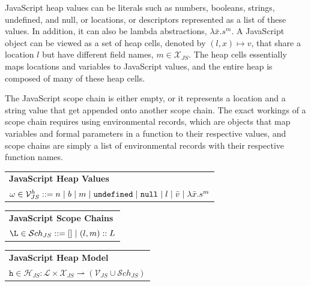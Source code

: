 \documentclass[a4paper,11pt,twoside]{report}
\begin{document}
JavaScript heap values can be literals such as numbers, booleans, strings, undefined, and null, or locations, or descriptors represented as a list of these values. In addition, it can also be lambda abstractions, $\lambda \bar{x}.s^m$. A JavaScript object can be viewed as a set of heap cells, denoted by $(l, x) \mapsto v$, that share a location $l$ but have different field names, $m \in \mathcal{X}_{JS}$. The heap cells essentially maps locations and variables to JavaScript values, and the entire heap is composed of many of these heap cells. 

The JavaScript scope chain is either empty, or it represents a location and a string value that get appended onto another scope chain. The exact workings of a scope chain requires using environmental records, which are objects that map variables and formal parameters in a function to their respective values, and scope chains are simply a list of environmental records with their respective function names.

\begin{center}
\begin{tabular}{p{10cm}} \hline
\textbf{JavaScript Heap Values} \\
$\omega \in \mathcal{V}_{JS}^{h} ::= n \hspace{3pt}|\hspace{3pt} b \hspace{3pt}|\hspace{3pt} m \hspace{3pt}|\hspace{3pt} \mathtt{undefined} \hspace{3pt}|\hspace{3pt} \mathtt{null} \hspace{3pt}|\hspace{3pt} l \hspace{3pt}|\hspace{3pt} \bar{v} \hspace{3pt}|\hspace{3pt} \lambda \bar{x}.s^m $  \\ \hline
\end{tabular}
\vspace{0.3cm}

\begin{tabular}{p{10cm}} \hline
\textbf{JavaScript Scope Chains} \\
$\L \in \mathcal{S}ch_{JS} ::= [ ] \myor (l, m) :: L $  \\ \hline
\end{tabular}
\vspace{0.3cm}

\begin{tabular}{p{10cm}} \hline
\textbf{JavaScript Heap Model} \\
$\texttt{h} \in \mathcal{H}_{JS} : \mathcal{L} \times \mathcal{X}_{JS} \rightharpoonup (\mathcal{V}_{JS} \cup \mathcal{S}ch_{JS})$  \\ \hline
\end{tabular}
\end{center}
\end{document}
